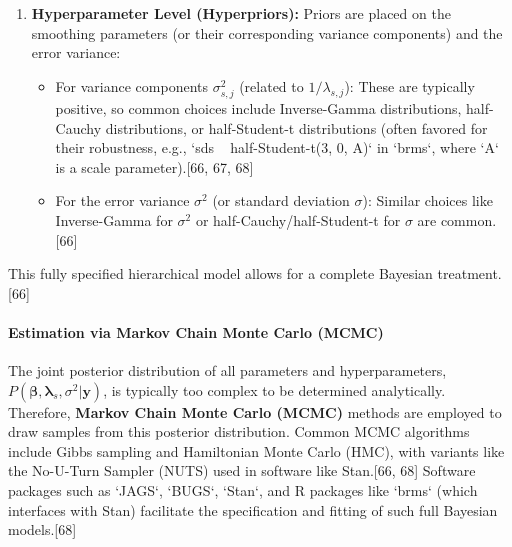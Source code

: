 \documentclass[11pt, a4paper]{article}
\begin{document}
\begin{itemize}
\begin{enumerate}
 \item \textbf{Hyperparameter Level (Hyperpriors):} Priors are placed on the smoothing parameters (or their corresponding variance components) and the error variance:
 \begin{itemize}
 \item For variance components $\sigma^2_{s,j}$ (related to $1/\lambda_{s,j}$): These are typically positive, so common choices include Inverse-Gamma distributions, half-Cauchy distributions, or half-Student-t distributions (often favored for their robustness, e.g., `sds ~ half-Student-t(3, 0, A)` in `brms`, where `A` is a scale parameter).[66, 67, 68]
 \item For the error variance $\sigma^2$ (or standard deviation $\sigma$): Similar choices like Inverse-Gamma for $\sigma^2$ or half-Cauchy/half-Student-t for $\sigma$ are common.[66]
 \end{itemize}
\end{enumerate}
This fully specified hierarchical model allows for a complete Bayesian treatment.[66]

\paragraph{Estimation via Markov Chain Monte Carlo (MCMC)}
The joint posterior distribution of all parameters and hyperparameters, $P(\boldsymbol{\beta}, \boldsymbol{\lambda}_s, \sigma^2 | \mathbf{y})$, is typically too complex to be determined analytically. Therefore, \textbf{Markov Chain Monte Carlo (MCMC)} methods are employed to draw samples from this posterior distribution. Common MCMC algorithms include Gibbs sampling and Hamiltonian Monte Carlo (HMC), with variants like the No-U-Turn Sampler (NUTS) used in software like Stan.[66, 68] Software packages such as `JAGS`, `BUGS`, `Stan`, and R packages like `brms` (which interfaces with Stan) facilitate the specification and fitting of such full Bayesian models.[68]


\end{itemize}
\end{document}

